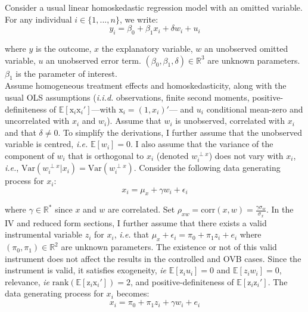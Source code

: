 \documentclass[usletter, 12pt]{article}
\begin{document}
			Consider a usual linear homoskedastic regression model with an omitted variable. For any individual $i \in \{1, ..., n\}$, we write:
				~
				\begin{equation}\label{maths_dgp_y}
					y_i = \beta_{0} + \beta_{1}x_{i} + \delta w_{i} + u_i
				\end{equation}
				
				where $y$ is the outcome, $x$ the explanatory variable,  $w$ an unobserved omitted variable, $u$ an unobserved error term.  $(\beta_0, \beta_1, \delta) \in \mathbb{R}^{3}$ are unknown parameters. $\beta_1$ is the parameter of interest.\\
			
			Assume homogeneous treatment effects and homoskedasticity, along with the usual OLS assumptions (\textit{i.i.d.} observations, finite second moments, positive-definiteness of $\mathbb{E}[\text{x}_i \text{x}_i']$---with $\text{x}_i = (1, x_i)'$--- and $u_{i}$ conditional mean-zero and uncorrelated with $x_i$ and $w_i$). Assume that $w_{i}$ is unobserved, correlated with $x_{i}$ and that $\delta \neq 0$. To simplify the derivations, I further assume that the unobserved variable is centred, \textit{i.e.} $\mathbb{E}[w_i] = 0$. I also assume that the variance of the component of $w_{i}$ that is orthogonal to $x_{i}$ (denoted $w_{i}^{\perp x}$) does not vary with $x_{i}$, \textit{i.e.}, $\text{Var}(w_{i}^{\perp x}|x_{i}) = \text{Var}(w_{i}^{\perp x})$. Consider the following data generating process for $x_i$:
				~
				\begin{equation}\label{maths_dgp_x}
					x_i = \mu_{x} + \gamma w_{i} + \epsilon_i
				\end{equation}
				
				where $\gamma \in \mathbb{R}^{*}$ since $x$ and $w$ are correlated. Set $\rho_{xw} = \text{corr}(x, w) =  \frac{\gamma \sigma_{w}}{\sigma_{x}}$. In the IV and reduced form sections, I further assume that there exists a valid instrumental variable $z_i$ for $x_i$, \textit{i.e.} that $\mu_x + \epsilon_{i} = \pi_0 + \pi_1 z_i + e_{i}$  where $(\pi_0, \pi_1) \in \mathbb{R}^{2}$ are unknown parameters. The existence or not of this valid instrument does not affect the results in the controlled and \textsc{OVB} cases. Since the instrument is valid, it satisfies exogeneity, \textit{ie} $\mathbb{E}[\text{z}_{i}u_{i}] = 0$ and  $\mathbb{E}[z_{i}w_{i}] = 0$, relevance, \textit{ie} $\text{rank}(\mathbb{E}[\text{z}_{i}\text{x}_i']) = 2$,  and positive-definiteness of $\mathbb{E}[\text{z}_i \text{z}_i']$. The data generating process for $x_i$ becomes:			
				~
				\begin{equation}\label{maths_dgp_x_iv}
					x_i = \pi_0 + \pi_1 z_i + \gamma w_{i} + e_{i}
				\end{equation}
				
\end{document}
